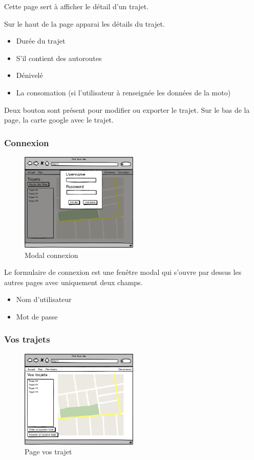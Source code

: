\documentclass[a4paper]{article}
\begin{document}
Cette page sert à afficher le détail d'un trajet.

Sur le haut de la page apparai les détails du trajet.
\begin{itemize}
    \item Durée du trajet
    \item S'il contient des autoroutes
    \item Dénivelé
    \item La consomation (si l'utilisateur à renseignée les données de la moto)
\end{itemize}
Deux bouton sont présent pour modifier ou exporter le trajet.
Sur le bas de la page, la carte google avec le trajet.

\subsubsection{Connexion}
\begin{figure}[h]
\centering
\includegraphics[width=0.5\textwidth]{./Images/Interfaces/Connexin.png}
\caption{Modal connexion}
\end{figure}

Le formulaire de connexion est une fenêtre modal qui s'ouvre par dessus les autres pages avec uniquement deux champs.
\begin{itemize}
    \item Nom d'utilisateur
    \item Mot de passe
\end{itemize}


\subsubsection{Vos trajets}
\begin{figure}[h]
\centering
\includegraphics[width=0.5\textwidth]{./Images/Interfaces/VosTrajets.png}
\caption{Page vos trajet}
\end{figure}
\end{document}
